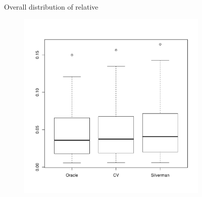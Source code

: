 \begin{figure}[htbp]
\begin{subfigure}[t]{0.45\textwidth}
        \label{fig:discussion:overall_centroidbias_boxplot:peak}
    \end{subfigure}
    \caption{Overall distribution of relative }
    \label{fig:discussion:overall_centroidbias_boxplot}
\end{figure}

\begin{figure}[htbp]
    \centering
    \begin{subfigure}[t]{0.45\textwidth}
        \includegraphics[width=\textwidth]{results/by_overall/relative-centroid-drift-boxplot}
        \label{fig:discussion:overall_centroiddrift_boxplot:unif}
    \end{subfigure}
    \begin{subfigure}[t]{0.45\textwidth}

\end{subfigure}
\end{figure}
